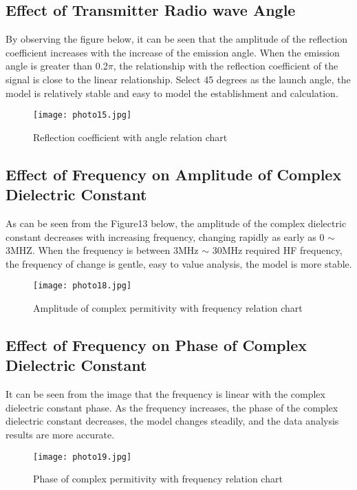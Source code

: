 \documentclass{mcmthesis}
\begin{document}
\subsection{Effect of Transmitter Radio wave Angle}%
By observing the figure below, it can be seen that the amplitude of the reflection coefficient increases with the increase of the emission angle. When the emission angle is greater than 0.2$\pi$, the relationship with the reflection coefficient of the signal is close to the linear relationship. Select 45 degrees as the launch angle, the model is relatively stable and easy to model the establishment and calculation.
\begin{figure}[h]
\small
\centering
\texttt{[image: photo15.jpg]}
\caption{Reflection coefficient with angle relation chart} \label{fig:aa}
\end{figure}
\subsection{Effect of Frequency on Amplitude of Complex Dielectric Constant}%
As can be seen from the Figure13 below, the amplitude of the complex dielectric constant decreases with increasing frequency, changing rapidly as early as 0 $\sim$ 3MHZ. When the frequency is between 3MHz $\sim$ 30MHz required HF frequency, the frequency of change is gentle, easy to value analysis, the model is more stable.
\begin{figure}[h]
\small
\centering
\texttt{[image: photo18.jpg]}
\caption{Amplitude of complex permitivity with frequency relation chart} \label{fig:aa}
\end{figure}
\subsection{Effect of Frequency on Phase of Complex Dielectric Constant}%
It can be seen from the image that the frequency is linear with the complex dielectric constant phase. As the frequency increases, the phase of the complex dielectric constant decreases, the model changes steadily, and the data analysis results are more accurate.
\begin{figure}[h]
\small
\centering
\texttt{[image: photo19.jpg]}
\caption{Phase of complex permitivity with frequency relation chart} \label{fig:aa}
\end{figure}
\end{document}

